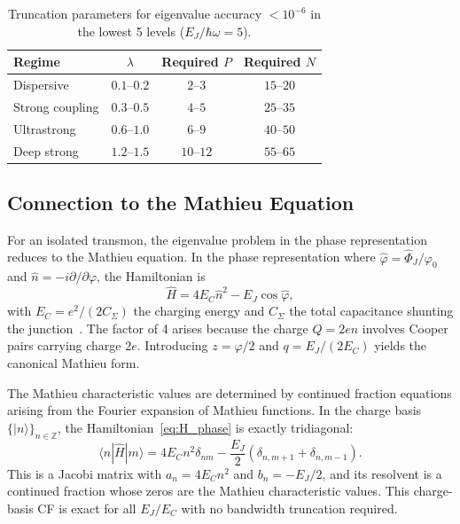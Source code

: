 \documentclass[reprint, floatfix, superscriptaddress, amsmath, amssymb, longbibliography]{revtex4-2}
\begin{document}
\begin{table}[t]
\caption{Truncation parameters for eigenvalue accuracy $< 10^{-6}$ in the lowest 5 levels ($E_J/\hbar\omega = 5$).}
\label{tab:truncation_requirements}
\begin{ruledtabular}
\begin{tabular}{lccc}
Regime & $\lambda$ & Required $P$ & Required $N$ \\
\midrule
Dispersive & $0.1$--$0.2$ & $2$--$3$ & $15$--$20$ \\
Strong coupling & $0.3$--$0.5$ & $4$--$5$ & $25$--$35$ \\
Ultrastrong & $0.6$--$1.0$ & $6$--$9$ & $40$--$50$ \\
Deep strong & $1.2$--$1.5$ & $10$--$12$ & $55$--$65$ \\
\end{tabular}
\end{ruledtabular}
\end{table}


\subsection{Connection to the Mathieu Equation}
\label{sec:mathieu}

For an isolated transmon, the eigenvalue problem in the phase representation reduces to the Mathieu equation. In the phase representation where $\hat{\varphi} = \hat{\Phi}_J/\varphi_0$ and $\hat{n} = -i\partial/\partial\varphi$, the Hamiltonian is
\begin{equation}
\hat{H} = 4E_C \hat{n}^2 - E_J \cos\hat{\varphi},
\label{eq:H_phase}
\end{equation}
with $E_C = e^2/(2C_\Sigma)$ the charging energy and $C_\Sigma$ the total capacitance shunting the junction~\cite{Koch2007}. The factor of 4 arises because the charge $Q = 2en$ involves Cooper pairs carrying charge $2e$. Introducing $z = \varphi/2$ and $q = E_J/(2E_C)$ yields the canonical Mathieu form.

The Mathieu characteristic values are determined by continued fraction equations arising from the Fourier expansion of Mathieu functions. In the charge basis $\{|n\rangle\}_{n \in \mathbb{Z}}$, the Hamiltonian~\eqref{eq:H_phase} is exactly tridiagonal:
\begin{equation}
\langle n | \hat{H} | m \rangle = 4E_C n^2 \delta_{nm} - \frac{E_J}{2}(\delta_{n,m+1} + \delta_{n,m-1}).
\end{equation}
This is a Jacobi matrix with $a_n = 4E_C n^2$ and $b_n = -E_J/2$, and its resolvent is a continued fraction whose zeros are the Mathieu characteristic values. This charge-basis CF is exact for all $E_J/E_C$ with no bandwidth truncation required.
\end{document}
